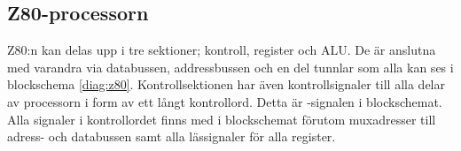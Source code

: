 \documentclass[main.tex]{subfiles}
\begin{document}
\subsection{Z80-processorn}
Z80:n kan delas upp i tre sektioner; kontroll, register och ALU. De är anslutna
med varandra via databussen, addressbussen och en del tunnlar som alla kan ses
i blockschema \ref{diag:z80}. Kontrollsektionen har även kontrollsignaler till
alla delar av processorn i form av ett långt kontrollord. Detta är
-signalen i blockschemat. Alla signaler i kontrollordet finns med i
blockschemat förutom muxadresser till adress- och databussen samt alla
lässignaler för alla register.




\end{document}
